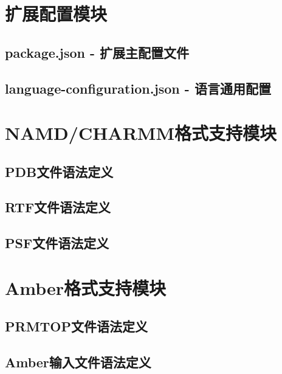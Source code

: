 
\section{扩展配置模块}
\subsection{package.json - 扩展主配置文件}


\subsection{language-configuration.json - 语言通用配置}


\section{NAMD/CHARMM格式支持模块}
\subsection{PDB文件语法定义}


\subsection{RTF文件语法定义}


\subsection{PSF文件语法定义}


\section{Amber格式支持模块}
\subsection{PRMTOP文件语法定义}


\subsection{Amber输入文件语法定义}


